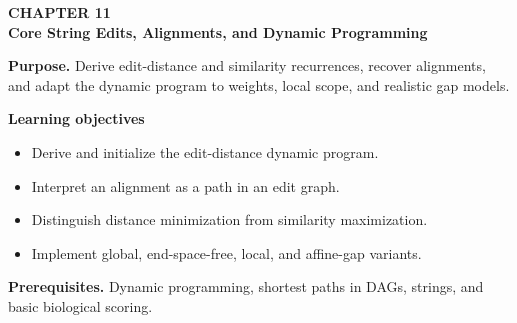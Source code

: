 \documentclass[11pt]{article}
\begin{document}
\begin{tcolorbox}[
  enhanced,breakable,colback=Primary!4,colframe=Primary,boxrule=0.9pt,
  arc=2mm,left=3mm,right=3mm,top=2.5mm,bottom=2.5mm]
{\sffamily\color{Accent}\bfseries CHAPTER 11}\\[-1pt]
{\sffamily\LARGE\bfseries\color{Primary} Core String Edits, Alignments, and Dynamic Programming}

\vspace{2pt}
\textbf{Purpose.} Derive edit-distance and similarity recurrences, recover alignments, and adapt the dynamic program to weights, local scope, and realistic gap models.

\textbf{Learning objectives}
\begin{itemize}
  \item Derive and initialize the edit-distance dynamic program.
  \item Interpret an alignment as a path in an edit graph.
  \item Distinguish distance minimization from similarity maximization.
  \item Implement global, end-space-free, local, and affine-gap variants.
\end{itemize}

\textbf{Prerequisites.} Dynamic programming, shortest paths in DAGs, strings, and basic biological scoring.
\end{tcolorbox}
\end{document}
